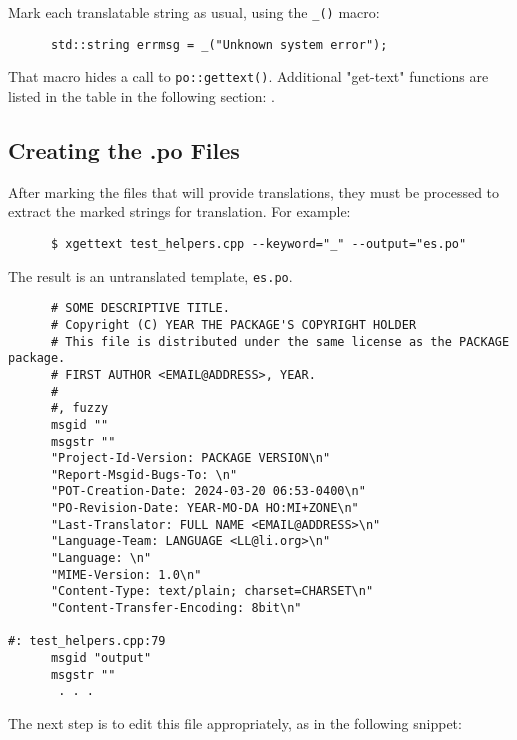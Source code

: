    Mark each translatable string as usual, using the
   \texttt{\_()} macro:

   \begin{verbatim}
      std::string errmsg = _("Unknown system error");
   \end{verbatim}

   That macro hides a call to \texttt{po::gettext()}.
   Additional "get-text" functions are listed in the table in the
   following section:
   .

\subsection{Creating the .po Files}
\label{subsubsec:potext_usage_creating_po_files}

   After marking the files that will provide translations, they must be
   processed to extract the marked strings for translation.
   For example:
   
   \begin{verbatim}
      $ xgettext test_helpers.cpp --keyword="_" --output="es.po"
   \end{verbatim}

   The result is an untranslated template, \texttt{es.po}.

   \begin{verbatim}
      # SOME DESCRIPTIVE TITLE.
      # Copyright (C) YEAR THE PACKAGE'S COPYRIGHT HOLDER
      # This file is distributed under the same license as the PACKAGE package.
      # FIRST AUTHOR <EMAIL@ADDRESS>, YEAR.
      #
      #, fuzzy
      msgid ""
      msgstr ""
      "Project-Id-Version: PACKAGE VERSION\n"
      "Report-Msgid-Bugs-To: \n"
      "POT-Creation-Date: 2024-03-20 06:53-0400\n"
      "PO-Revision-Date: YEAR-MO-DA HO:MI+ZONE\n"
      "Last-Translator: FULL NAME <EMAIL@ADDRESS>\n"
      "Language-Team: LANGUAGE <LL@li.org>\n"
      "Language: \n"
      "MIME-Version: 1.0\n"
      "Content-Type: text/plain; charset=CHARSET\n"
      "Content-Transfer-Encoding: 8bit\n"

#: test_helpers.cpp:79
      msgid "output"
      msgstr ""
       . . .
   \end{verbatim}

   The next step is to edit this file appropriately, as in the following
   snippet:

